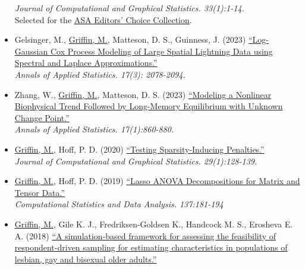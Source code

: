 \documentclass[11pt]{article}
\newcommand{\tab}{\hspace*{2em}}
\begin{document}
\begin{itemize}
	\tab \emph{Journal of Computational and Graphical Statistics. 33(1):1-14.} \\
	\tab Selected for the \href{https://www.tandfonline.com/journals/uasa20/collections/EditorsChoiceCollectionUASA}{ASA Editors' Choice Collection}. \vspace{-2mm}
	\item[] Gelsinger, M., \underline{Griffin, M.}, Matteson, D. S., Guinness, J. (2023) \href{https://projecteuclid.org/journals/annals-of-applied-statistics/volume-17/issue-3/Log-Gaussian-Cox-process-modeling-of-large-spatial-lightning-data/10.1214/22-AOAS1708.short}{``Log-Gaussian Cox Process Modeling of Large Spatial Lightning Data using Spectral and Laplace Approximations.''} \\
	\tab \emph{Annals of Applied Statistics. 17(3): 2078-2094.} \vspace{-2mm}
	\item[] Zhang, W., \underline{Griffin, M.}, Matteson, D. S. (2023) \href{https://projecteuclid.org/journals/annals-of-applied-statistics/volume-17/issue-1/Modeling-a-nonlinear-biophysical-trend-followed-by-long-memory-equilibrium/10.1214/22-AOAS1655.short}{``Modeling a Nonlinear Biophysical Trend Followed by Long-Memory Equilibrium with Unknown Change Point.''} \\
	\tab \emph{Annals of Applied Statistics. 17(1):860-880.} \vspace{-2mm}
	\item[] \underline{Griffin, M.}, Hoff, P. D. (2020) \href{https://doi.org/10.1080/10618600.2019.1637749}{``Testing Sparsity-Inducing Penalties.''} \\ 
	\tab \emph{ Journal of Computational and Graphical Statistics. 29(1):128-139.}  \vspace{-2mm}
	\item[] \underline{Griffin, M.}, Hoff, P. D. (2019) \href{https://doi.org/10.1016/j.csda.2019.02.005}{``Lasso ANOVA Decompositions for Matrix and Tensor Data.''} \\
	\tab \emph{ Computational Statistics and Data Analysis. 137:181-194}  \vspace{-2mm}
	\item[] \underline{Griffin, M.}, Gile K. J., Fredriksen-Goldsen K., Handcock M. S., Erosheva E. A. (2018) \href{https://projecteuclid.org/euclid.aoas/1542078044}{``A simulation-based framework for assessing the feasibility of respondent-driven sampling for estimating characteristics in populations of lesbian, gay and bisexual older adults.''} \\

\end{itemize}
\end{document}
